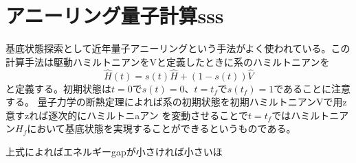 \section{アニーリング量子計算sss}
基底状態探索として近年量子アニーリングという手法がよく使われている。この計算手法は駆動ハミルトニアンをVと定義したときに系のハミルトニアンを
\begin{equation}
    \hat{H}(t) = s(t) \hat{H} +(1-s(t))\hat{V}
\end{equation}
と定義する。初期状態は$t=0$で$s(t)=0$、$t=t_f$で$s(t_f)=1$であることに注意する。
量子力学の断熱定理によれば系の初期状態を初期ハミルトニアンVで用z意すzれば逐次的にハミルトニaアン
を変動させることで$t=t_f$ではハミルトニアン$H_f$において基底\cite*{Baust2015}状態を実現することができるというものである。

上式によればエネルギーgapが小さければ小さいほ\cite*{Wulschner2016}